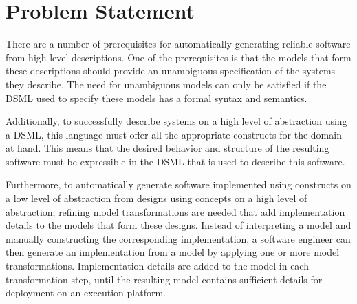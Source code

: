 \section{Problem Statement}
\label{sec:introduction:problem-statement}


There are a number of prerequisites for automatically generating reliable software from high-level descriptions.
One of the prerequisites is that the models that form these descriptions should provide an unambiguous specification of the systems they describe.
The need for unambiguous models can only be satisfied if the DSML used to specify these models has a formal syntax and semantics.


Additionally, to successfully describe systems on a high level of abstraction using a DSML, this language must offer all the appropriate constructs for the domain at hand.
This means that the desired behavior and structure of the resulting software must be expressible in the DSML that is used to describe this software.

%

Furthermore, to automatically generate software implemented using constructs on a low level of abstraction from designs using concepts on a high level of abstraction, refining model transformations are needed that add implementation details to the models that form these designs.
Instead of interpreting a model and manually constructing the corresponding implementation, a software engineer can then generate an implementation from a model by applying one or more model transformations.
Implementation details are added to the model in each transformation step, until the resulting model contains sufficient details for deployment on an execution platform.

